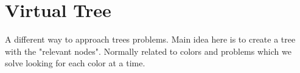 
    \section{Virtual Tree}
    A different way to approach trees problems. Main idea here is to create a tree with the "relevant nodes". Normally related to colors and problems which we solve looking for each color at a time.
    
